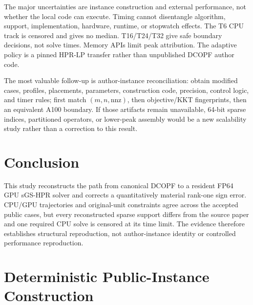 \documentclass[10pt,journal]{IEEEtran}
\newcommand{\sgshpr}{sGS-HPR}
\begin{document}
The major uncertainties are instance construction and external performance,
not whether the local code can execute. Timing cannot disentangle algorithm,
support, implementation, hardware, runtime, or stopwatch effects. The T6 CPU
track is censored and gives no median. T16/T24/T32 give safe boundary decisions,
not solve times. Memory APIs limit peak attribution. The adaptive policy is a
pinned HPR-LP transfer rather than unpublished DCOPF author code.

The most valuable follow-up is author-instance reconciliation: obtain modified
cases, profiles, placements, parameters, construction code, precision,
control logic, and timer rules; first match $(m,n,\mathrm{nnz})$, then
objective/KKT fingerprints, then an equivalent A100 boundary. If those
artifacts remain unavailable, 64-bit sparse indices, partitioned operators,
or lower-peak assembly would be a new scalability study rather than a
correction to this result.

\section{Conclusion}

This study reconstructs the path from canonical DCOPF to a resident FP64 GPU
\sgshpr{} solver and corrects a quantitatively material rank-one sign error.
CPU/GPU trajectories and original-unit constraints agree across the accepted
public cases, but every reconstructed sparse support differs from the source
paper and one required CPU solve is censored at its time limit. The evidence
therefore establishes structural reproduction, not author-instance identity
or controlled performance reproduction.

\appendices

\section{Deterministic Public-Instance Construction}
\label{app:recipe}
\end{document}
